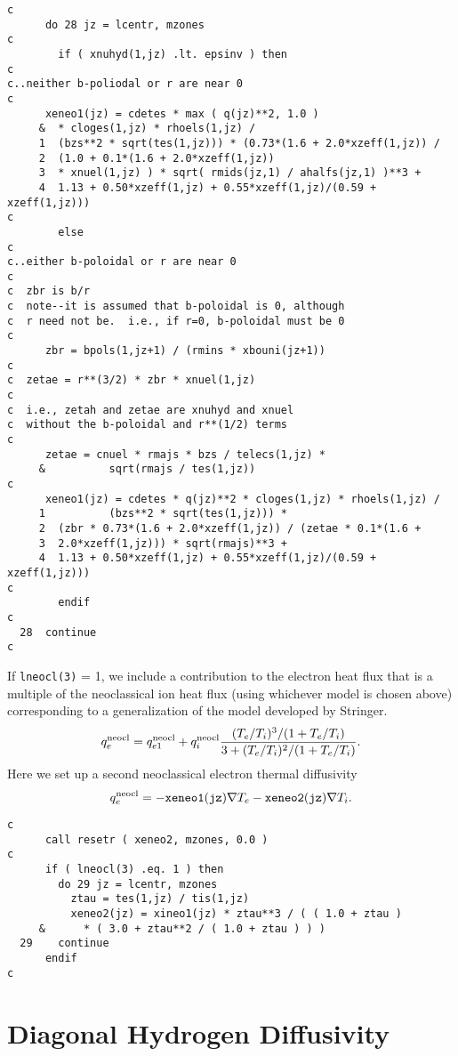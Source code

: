 \begin{verbatim}
c
      do 28 jz = lcentr, mzones
c
        if ( xnuhyd(1,jz) .lt. epsinv ) then
c
c..neither b-poliodal or r are near 0
c
      xeneo1(jz) = cdetes * max ( q(jz)**2, 1.0 )
     &  * cloges(1,jz) * rhoels(1,jz) /
     1  (bzs**2 * sqrt(tes(1,jz))) * (0.73*(1.6 + 2.0*xzeff(1,jz)) /
     2  (1.0 + 0.1*(1.6 + 2.0*xzeff(1,jz))
     3  * xnuel(1,jz) ) * sqrt( rmids(jz,1) / ahalfs(jz,1) )**3 +
     4  1.13 + 0.50*xzeff(1,jz) + 0.55*xzeff(1,jz)/(0.59 + xzeff(1,jz)))
c
        else
c
c..either b-poloidal or r are near 0
c
c  zbr is b/r
c  note--it is assumed that b-poloidal is 0, although
c  r need not be.  i.e., if r=0, b-poloidal must be 0
c
      zbr = bpols(1,jz+1) / (rmins * xbouni(jz+1))
c
c  zetae = r**(3/2) * zbr * xnuel(1,jz)
c
c  i.e., zetah and zetae are xnuhyd and xnuel
c  without the b-poloidal and r**(1/2) terms
c
      zetae = cnuel * rmajs * bzs / telecs(1,jz) *
     &          sqrt(rmajs / tes(1,jz))
c
      xeneo1(jz) = cdetes * q(jz)**2 * cloges(1,jz) * rhoels(1,jz) /
     1          (bzs**2 * sqrt(tes(1,jz))) *
     2  (zbr * 0.73*(1.6 + 2.0*xzeff(1,jz)) / (zetae * 0.1*(1.6 +
     3  2.0*xzeff(1,jz))) * sqrt(rmajs)**3 +
     4  1.13 + 0.50*xzeff(1,jz) + 0.55*xzeff(1,jz)/(0.59 + xzeff(1,jz)))
c
        endif
c
  28  continue
c
\end{verbatim}

If {\tt lneocl(3)} = 1, we include a contribution to the electron heat
flux that is a multiple of the neoclassical ion heat flux (using 
whichever model is chosen above) corresponding to a generalization
of the model developed by Stringer.\cite{stri91a}
$$ q_e^{\rm neocl} = q_{e1}^{\rm neocl} + q_i^{\rm neocl} 
\frac{(T_e/T_i)^3/(1 + T_e/T_i )}{3 + (T_e/T_i)^2/(1 + T_e/T_i )}. $$
Here we set up a second neoclassical electron thermal diffusivity
$$ q_e^{\rm neocl} = - {\tt xeneo1(jz)} \nabla T_e
 - {\tt xeneo2(jz)} \nabla T_i.  $$

\begin{verbatim}
c
      call resetr ( xeneo2, mzones, 0.0 )
c
      if ( lneocl(3) .eq. 1 ) then
        do 29 jz = lcentr, mzones
          ztau = tes(1,jz) / tis(1,jz)
          xeneo2(jz) = xineo1(jz) * ztau**3 / ( ( 1.0 + ztau )
     &      * ( 3.0 + ztau**2 / ( 1.0 + ztau ) ) )
  29    continue
      endif
c
\end{verbatim}

\section{Diagonal Hydrogen Diffusivity}

